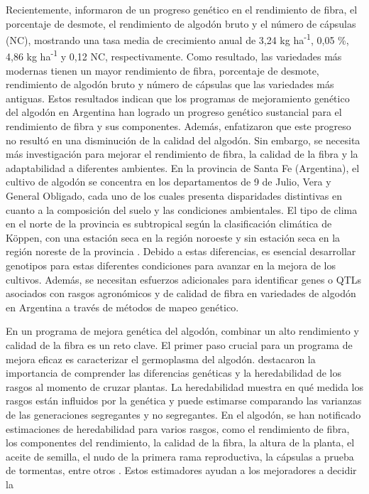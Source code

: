 \documentclass[12pt,oneside]{reedthesis}
\begin{document}
Recientemente, \textcite{scarpin2022} informaron de un progreso genético en el rendimiento de fibra, el porcentaje de desmote, el rendimiento de algodón bruto y el número de cápsulas (NC), mostrando una tasa media de crecimiento anual de 3,24 kg ha\textsuperscript{-1}, 0,05 \%, 4,86 kg ha\textsuperscript{-1} y 0,12 NC, respectivamente. Como resultado, las variedades más modernas tienen un mayor rendimiento de fibra, porcentaje de desmote, rendimiento de algodón bruto y número de cápsulas que las variedades más antiguas. Estos resultados indican que los programas de mejoramiento genético del algodón en Argentina han logrado un progreso genético sustancial para el rendimiento de fibra y sus componentes. Además, \textcite{scarpin2023} enfatizaron que este progreso no resultó en una disminución de la calidad del algodón. Sin embargo, se necesita más investigación para mejorar el rendimiento de fibra, la calidad de la fibra y la adaptabilidad a diferentes ambientes. En la provincia de Santa Fe (Argentina), el cultivo de algodón se concentra en los departamentos de 9 de Julio, Vera y General Obligado, cada uno de los cuales presenta disparidades distintivas en cuanto a la composición del suelo y las condiciones ambientales. El tipo de clima en el norte de la provincia es subtropical según la clasificación climática de Köppen, con una estación seca en la región noroeste y sin estación seca en la región noreste de la provincia \autocite{anida2024}. Debido a estas diferencias, es esencial desarrollar genotipos para estas diferentes condiciones para avanzar en la mejora de los cultivos. Además, se necesitan esfuerzos adicionales para identificar genes o QTLs asociados con rasgos agronómicos y de calidad de fibra en variedades de algodón en Argentina a través de métodos de mapeo genético.

En un programa de mejora genética del algodón, combinar un alto rendimiento y calidad de la fibra es un reto clave. El primer paso crucial para un programa de mejora eficaz es caracterizar el germoplasma del algodón. \textcite{kearsey1996} destacaron la importancia de comprender las diferencias genéticas y la heredabilidad de los rasgos al momento de cruzar plantas. La heredabilidad muestra en qué medida los rasgos están influidos por la genética y puede estimarse comparando las varianzas de las generaciones segregantes y no segregantes. En el algodón, se han notificado estimaciones de heredabilidad para varios rasgos, como el rendimiento de fibra, los componentes del rendimiento, la calidad de la fibra, la altura de la planta, el aceite de semilla, el nudo de la primera rama reproductiva, la cápsulas a prueba de tormentas, entre otros \autocite{meredith1984,tang1996,ribeiro2017,decarvalho2022,nidagundi2023}. Estos estimadores ayudan a los mejoradores a decidir la
\end{document}
